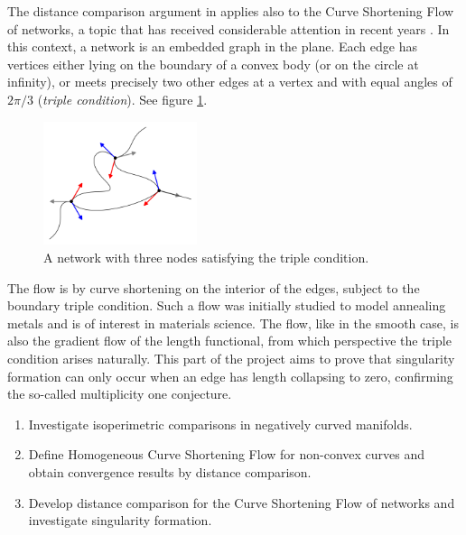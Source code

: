\documentclass[12pt]{amsart}
\begin{document}
The distance comparison argument in \cite{MR2794630} applies also to the Curve Shortening Flow of networks, a topic that has received considerable attention in recent years \cite{MR2394409,MR2075985,MR2763716}. In this context, a network is an embedded graph in the plane. Each edge has vertices either lying on the boundary of a convex body (or on the circle at infinity), or meets precisely two other edges at a vertex and with equal angles of \(2\pi/3\) (\emph{triple condition}). See figure \ref{fg:network}.
\begin{figure}[htb]
\centering
\includegraphics[width=0.4\textwidth]{img/network.png}
\caption{\label{fg:network}
A network with three nodes satisfying the triple condition.}
\end{figure}

The flow is by curve shortening on the interior of the edges, subject to the boundary triple condition. Such a flow was initially studied to model annealing metals \cite{MR0078836} and is of interest in materials science. The flow, like in the smooth case, is also the gradient flow of the length functional, from which perspective the triple condition arises naturally. This part of the project aims to prove that singularity formation can only occur when an edge has length collapsing to zero, confirming the so-called multiplicity one conjecture.

\begin{enumerate}[label=\textbf{(A.\arabic*)}]
\item Investigate isoperimetric comparisons in negatively curved manifolds.
\item Define Homogeneous Curve Shortening Flow for non-convex curves and obtain convergence results by distance comparison.
\item Develop distance comparison for the Curve Shortening Flow of networks and investigate singularity formation.
\end{enumerate}
\end{document}
